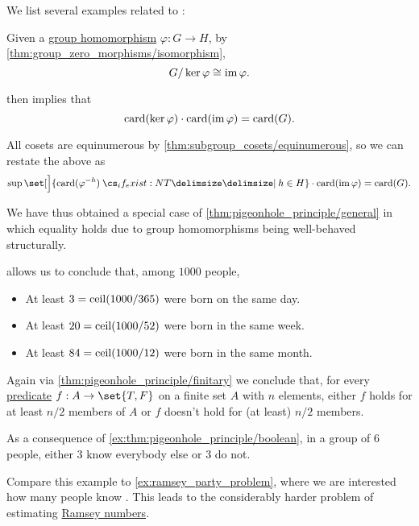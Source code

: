 \begin{example}\label{ex:thm:pigeonhole_principle}
  We list several examples related to :
  \begin{thmenum}
     Given a \hyperref[def:group/homomorphism]{group homomorphism} \( \varphi: G \to H \), by \cref{thm:group_zero_morphisms/isomorphism},
    \begin{equation*}
      G / \ker \varphi \cong \operatorname{im} \varphi.
    \end{equation*}

     then implies that
    \begin{equation*}
      \operatorname{card}(\ker \varphi) \cdot \operatorname{card}(\operatorname{im} \varphi) = \operatorname{card}(G).
    \end{equation*}

    All cosets are equinumerous by \cref{thm:subgroup_cosets/equinumerous}, so we can restate the above as
    \begin{equation*}
      \sup\set[\Big]{ \card(\varphi^{-h}) \given* h \in H } \cdot \card(\img \varphi) = \card(G).
    \end{equation*}

    We have thus obtained a special case of \cref{thm:pigeonhole_principle/general} in which equality holds due to group homomorphisms being well-behaved structurally.

      allows us to conclude that, among \( 1000 \) people,
    \begin{itemize}
      \item At least \( 3 = \operatorname{ceil}(1000 / 365) \) were born on the same day.
      \item At least \( 20 = \operatorname{ceil}(1000 / 52) \) were born in the same week.
      \item At least \( 84 = \operatorname{ceil}(1000 / 12) \) were born in the same month.
    \end{itemize}

     Again via \cref{thm:pigeonhole_principle/finitary} we conclude that, for every \hyperref[def:boolean_function]{predicate} \( f: A \to \set{ T, F } \) on a finite set \( A \) with \( n \) elements, either \( f \) holds for at least \( n / 2 \) members of \( A \) or \( f \) doesn't hold for (at least) \( n / 2 \) members.

     As a consequence of \cref{ex:thm:pigeonhole_principle/boolean}, in a group of \( 6 \) people, either \( 3 \) know everybody else or \( 3 \) do not.

    Compare this example to \cref{ex:ramsey_party_problem}, where we are interested how many people know . This leads to the considerably harder problem of estimating \hyperref[def:ramsey_number]{Ramsey numbers}.
  \end{thmenum}
\end{example}

